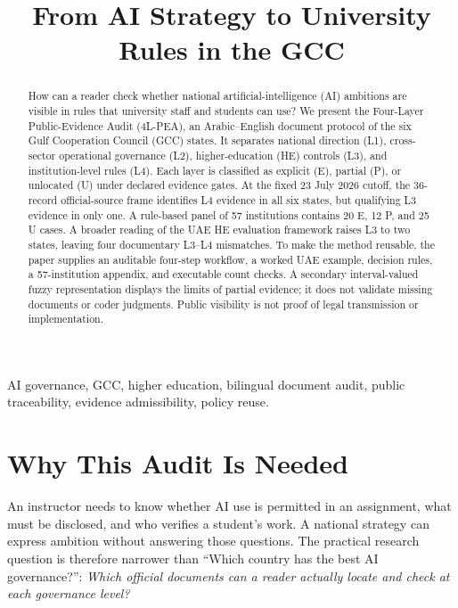 \documentclass[conference,letterpaper]{IEEEtran}
\begin{document}
\title{From AI Strategy to University Rules in the GCC}
\author{}
\maketitle
\begin{abstract}
How can a reader check whether national artificial-intelligence (AI) ambitions are visible in rules that university staff and students can use? We present the Four-Layer Public-Evidence Audit (4L-PEA), an Arabic--English document protocol of the six Gulf Cooperation Council (GCC) states. It separates national direction (L1), cross-sector operational governance (L2), higher-education (HE) controls (L3), and institution-level rules (L4). Each layer is classified as explicit (E), partial (P), or unlocated (U) under declared evidence gates. At the fixed 23 July 2026 cutoff, the 36-record official-source frame identifies L4 evidence in all six states, but qualifying L3 evidence in only one. A rule-based panel of 57 institutions contains 20 E, 12 P, and 25 U cases. A broader reading of the UAE HE evaluation framework raises L3 to two states, leaving four documentary L3--L4 mismatches. To make the method reusable, the paper supplies an auditable four-step workflow, a worked UAE example, decision rules, a 57-institution appendix, and executable count checks. A secondary interval-valued fuzzy representation displays the limits of partial evidence; it does not validate missing documents or coder judgments. Public visibility is not proof of legal transmission or implementation.
\end{abstract}
\begin{IEEEkeywords}
AI governance, GCC, higher education, bilingual document audit, public traceability, evidence admissibility, policy reuse.
\end{IEEEkeywords}

\section{Why This Audit Is Needed}
An instructor needs to know whether AI use is permitted in an assignment, what must be disclosed, and who verifies a student's work. A national strategy can express ambition without answering those questions. The practical research question is therefore narrower than ``Which country has the best AI governance?'': \emph{Which official documents can a reader actually locate and check at each governance level?}
\end{document}
